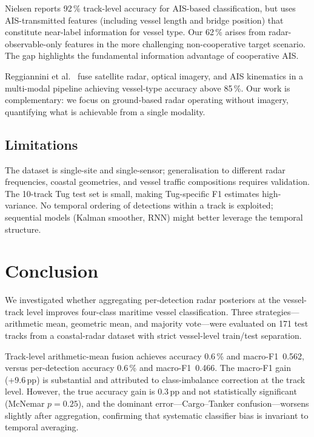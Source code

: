 \documentclass[10pt,journal,compsoc]{IEEEtran}
\begin{document}
Nielsen \cite{nielsen_2025} reports 92\,\% track-level accuracy for
AIS-based classification, but uses AIS-transmitted features (including vessel
length and bridge position) that constitute near-label information for vessel
type.  Our 62\,\% arises from radar-observable-only features in the more
challenging non-cooperative target scenario.  The gap highlights the
fundamental information advantage of cooperative AIS.

Reggiannini et al.\ \cite{osiris_2024} fuse satellite radar, optical imagery,
and AIS kinematics in a multi-modal pipeline achieving vessel-type accuracy
above 85\,\%.  Our work is complementary: we focus on ground-based radar
operating without imagery, quantifying what is achievable from a single
modality.

\subsection{Limitations}

The dataset is single-site and single-sensor; generalisation to different
radar frequencies, coastal geometries, and vessel traffic compositions
requires validation.  The 10-track Tug test set is small, making
Tug-specific F1 estimates high-variance.  No temporal ordering of detections
within a track is exploited; sequential models (Kalman smoother, RNN) might
better leverage the temporal structure.

\section{Conclusion}\label{sec:conclusion}

We investigated whether aggregating per-detection radar posteriors at the
vessel-track level improves four-class maritime vessel classification.
Three strategies---arithmetic mean, geometric mean, and majority vote---were
evaluated on 171 test tracks from a coastal-radar dataset with strict
vessel-level train/test separation.

Track-level arithmetic-mean fusion achieves accuracy 0.6\,\% and macro-F1~0.562, versus
per-detection accuracy 0.6\,\% and macro-F1~0.466.  The macro-F1 gain (+9.6\,pp) is substantial and attributed to
class-imbalance correction at the track level.  However, the true accuracy
gain is 0.3\,pp and not statistically significant (McNemar $p=0.25$), and the dominant error---Cargo--Tanker
confusion---worsens slightly after aggregation, confirming that systematic
classifier bias is invariant to temporal averaging.
\end{document}
